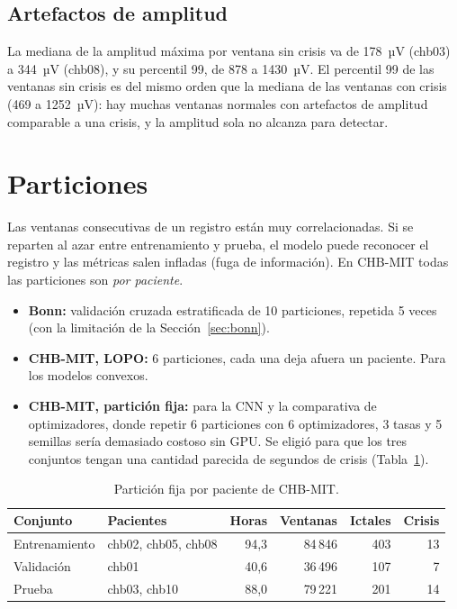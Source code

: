 \subsection{Artefactos de amplitud}

La mediana de la amplitud máxima por ventana sin crisis va de 178~µV (chb03) a 344~µV (chb08), y su percentil 99,
de 878 a 1430~µV. El percentil 99 de las ventanas sin crisis es del mismo orden que la mediana de las ventanas con
crisis (469 a 1252~µV): hay muchas ventanas normales con artefactos de amplitud comparable a una crisis, y la
amplitud sola no alcanza para detectar.

\section{Particiones}
\label{sec:particiones}

Las ventanas consecutivas de un registro están muy correlacionadas. Si se reparten al azar entre entrenamiento
y prueba, el modelo puede reconocer el registro y las métricas salen infladas (fuga de información). En CHB-MIT
todas las particiones son \emph{por paciente}.
\begin{itemize}
  \item \textbf{Bonn:} validación cruzada estratificada de 10 particiones, repetida 5 veces (con la limitación de la
        Sección~\ref{sec:bonn}).
  \item \textbf{CHB-MIT, LOPO:} 6 particiones, cada una deja afuera un paciente. Para los modelos convexos.
  \item \textbf{CHB-MIT, partición fija:} para la CNN y la comparativa de optimizadores, donde repetir 6 particiones
        con 6 optimizadores, 3 tasas y 5 semillas sería demasiado costoso sin GPU. Se eligió para que los tres
        conjuntos tengan una cantidad parecida de segundos de crisis (Tabla~\ref{tab:particion}).
\end{itemize}

\begin{table}[ht]
\centering
\caption{Partición fija por paciente de CHB-MIT.}
\label{tab:particion}
\begin{tabular}{llrrrr}
\toprule
Conjunto & Pacientes & Horas & Ventanas & Ictales & Crisis \\
\midrule
Entrenamiento & chb02, chb05, chb08 & 94,3 & 84\,846 & 403 & 13 \\
Validación    & chb01               & 40,6 & 36\,496 & 107 & 7 \\
Prueba        & chb03, chb10        & 88,0 & 79\,221 & 201 & 14 \\
\bottomrule
\end{tabular}
\end{table}

